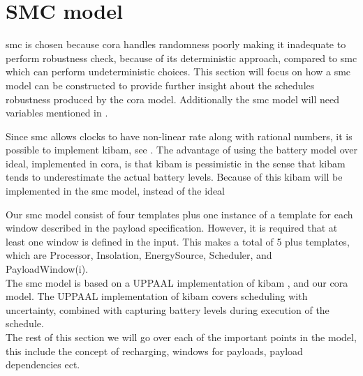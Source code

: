 \section{SMC model} \label{sec:smc_model}
\Gls{smc} is chosen because \gls{cora} handles randomness poorly making it inadequate to perform robustness check, because of its deterministic approach, compared to \gls{smc} which can perform undeterministic choices. This section will focus on how a \gls{smc} model can be constructed to provide further insight about the schedules robustness produced by the \gls{cora} model. Additionally the \gls{smc} model will need variables mentioned in .

Since \gls{smc} allows clocks to have non-linear rate along with rational numbers, it is possible to implement \gls{kibam}, see . The advantage of using the battery model over ideal, implemented in \gls{cora}, is that \gls{kibam} is pessimistic in the sense that \gls{kibam} tends to underestimate the actual battery levels. Because of this \gls{kibam} will be implemented in the \gls{smc} model, instead of the ideal

Our \gls{smc} model consist of four templates plus one instance of a template for each window described in the payload specification. However, it is required that at least one window is defined in the input. This makes a total of 5 plus templates, which are Processor, Insolation, EnergySource, Scheduler, and PayloadWindow(i).\\ 
The \gls{smc} model is based on a UPPAAL implementation of \gls{kibam} \cite{battery_aware_scheduling}, and our \gls{cora} model. The UPPAAL implementation of \gls{kibam} covers scheduling with uncertainty, combined with capturing battery levels during execution of the schedule. \\
The rest of this section we will go over each of the important points in the model, this include the concept of recharging, windows for payloads, payload dependencies ect. 

